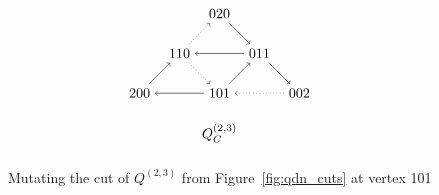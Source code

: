 \documentclass[ALCO,Unicode,published]{cedram}
\begin{document}
\begin{figure}
\caption{Mutating the cut of $Q^{(2,3)}$ from Figure~\ref{fig:qdn_cuts} at vertex 101}\label{fig:cut_mut}
\[
\begin{tikzpicture}


\begin{scope}[shift={(3,0)}]

\node(200) at (0,0) {200};
\node(110) at (1,1) {110};
\node(020) at (2,2) {020};
\node(011) at (3,1) {011};
\node(002) at (4,0) {002};
\node(101) at (2,0) {101};

\draw[->] (200) -- (110);
\draw[->,dotted] (110) -- (020);
\draw[->] (020) -- (011);
\draw[->] (011) -- (002);
\draw[->,dotted] (002) -- (101);
\draw[->] (101) -- (200);
\draw[->,dotted] (110) -- (101);
\draw[->] (101) -- (011);
\draw[->] (011) -- (110);

\node at (2,-1) {$Q_{C}^{(2,3)}$};

\end{scope}

\end{tikzpicture}
\]
\end{figure}
\end{document}
